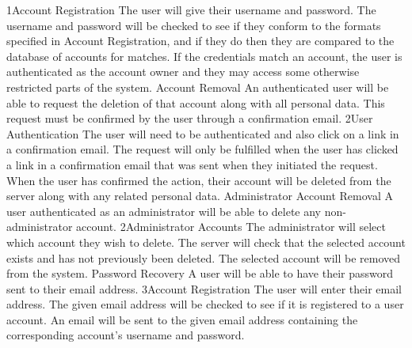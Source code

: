 			{1}{Account Registration}
			{The user will give their username and password.}
			{The username and password will be checked to see if they conform 
			to the formats specified in Account Registration, and if they do 
			then they are compared to the database of accounts for matches.}
			{If the credentials match an account, the user is authenticated as 
			the account owner and they may access some otherwise restricted 
			parts of the system.}
		\funcreq
			{Account Removal}
			{An authenticated user will be able to request the deletion of 
			that account along with all personal data. This request must be 
			confirmed by the user through a confirmation email.}
			{2}{User Authentication}
			{The user will need to be authenticated and also click on a link 
			in a confirmation email.}
			{The request will only be fulfilled when the user has clicked a 
			link in a confirmation email that was sent when they initiated the 
			request.}
			{When the user has confirmed the action, their account will be 
			deleted from the server along with any related personal data.}
		\funcreq
			{Administrator Account Removal}
			{A user authenticated as an administrator will be able to delete any non-administrator account.}
			{2}{Administrator Accounts}
			{The administrator will select which account they wish to delete.}
			{The server will check that the selected account exists and has not previously been deleted.}
			{The selected account will be removed from the system.}
		\funcreq
			{Password Recovery}
			{A user will be able to have their password sent to their email 
			address.}
			{3}{Account Registration}
			{The user will enter their email address.}
			{The given email address will be checked to see if it is 
			registered to a user account.}
			{An email will be sent to the given email address containing the 
			corresponding account's username and password.}
